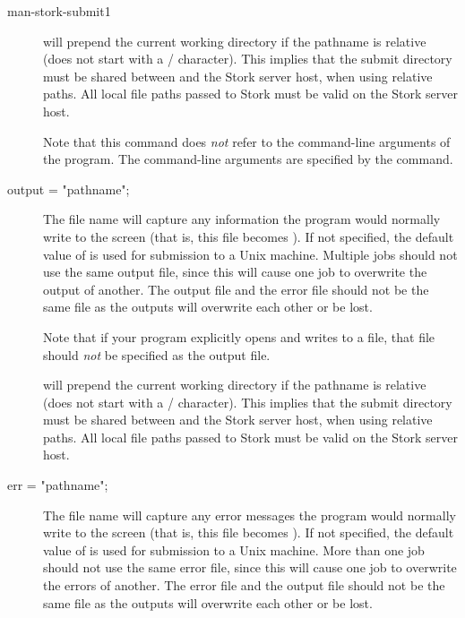 \begin{ManPage}{}{man-stork-submit}{1}
\begin{description}
 will prepend the current working directory if the pathname is
relative (does not start with a / character).  This implies that the submit
directory must be shared between  and the Stork server host, when
using relative paths.  All local file paths passed to Stork must be valid on
the Stork server host.

Note that this command does \emph{not} refer to the command-line
arguments of the program.  The command-line arguments are specified by
the  command.


\item[output = "\lt{}pathname\gt{}";]
The  file name will capture
any information the program would normally write to the screen
(that is, this file becomes ).
If not specified, the default value of
 is used for submission to a Unix machine.
Multiple jobs should not use the same output
file, since this will cause one job to overwrite the output of
another.
The output file and the error file should not be the same file
as the outputs will overwrite each other or be lost.

Note that if your program explicitly opens and writes to a file,
that file should \emph{not} be specified as the output file.

 will prepend the current working directory if the pathname is
relative (does not start with a / character).  This implies that the submit
directory must be shared between  and the Stork server host, when
using relative paths.  All local file paths passed to Stork must be valid on
the Stork server host.


\item[err = "\lt{}pathname\gt{}";]
The  file name will capture any
error messages the program would normally write to the screen
(that is, this file becomes ).
If not specified, the default value of
 is used for submission to a Unix machine.
More than one job should not use the same error file, since
this will cause one job to overwrite the errors of another.
The error file and the output file should not be the same file
as the outputs will overwrite each other or be lost.


\end{description}
\end{ManPage}
